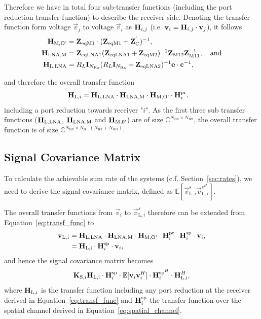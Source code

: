 Therefore we have in total four sub-transfer functions (including the port reduction transfer function) to describe the receiver side.
Denoting the transfer function form voltage $\vec{v}_j$ to voltage $\vec{v}_i$ as $\mathbf{H}_{i,j}$ (i.e. $\mathbf{v}_i = \mathbf{H}_{i,j} \cdot\mathbf{v}_j$), it follows
\begin{align}
\mathbf{H}_\text{M,O'} &= \mathbf{Z}_\text{eqM1}\cdot(\mathbf{Z}_\text{eqM1} + \mathbf{Z}_\text{C}^{'})^{-1}, \\
\mathbf{H}_\text{LNA,M} &= \mathbf{Z}_\text{eqLNA1}(\mathbf{Z}_\text{eqLNA1}+\mathbf{Z}_\text{eqM2})^{-1}\mathbf{Z}_\text{M12} \mathbf{Z}_\text{M11}^{-1},\quad\text{and}\\
\mathbf{H}_\text{L,LNA} &= R_L\mathbf{I}_{N_\text{Rx}}(R_L\mathbf{I}_{N_\text{Rx}}+\mathbf{Z}_\text{eqLNA2})^{-1}\mathbf{e}\cdot\mathbf{c}^{-1},
\end{align}

and therefore the overall transfer function
\begin{align}
\label{eq:transf_func}
\mathbf{H}_{\text{L},i} &= 
	\mathbf{H}_\text{L,LNA}\cdot\mathbf{H}_\text{LNA,M}\cdot\mathbf{H}_\text{M,O'}\cdot\mathbf{H}_i^\text{pr}.
\end{align}
including a port reduction towards receiver "$i$".
As the first three sub transfer functions ($\mathbf{H}_\text{L,LNA}$, $\mathbf{H}_\text{LNA,M}$ and $\mathbf{H}_\text{M,0'}$) are of size
$\mathbb{C}^{N_\text{Rx}\times N_\text{Rx}}$, the overall transfer function is of size
$\mathbb{C}^{N_\text{Rx}\times N_\text{R}\cdot\left(N_\text{Rx}+N_\text{Rel}\right)}$.
	


\subsection{Signal Covariance Matrix}
\label{sec:sig_cov}
To calculate the achievable sum rate of the systems (c.f. Section~\ref{sec:rates}), we need to derive the signal covariance matrix, defined as $\mathbb{E}[\vec{v}_{\text{L},i}^s\vec{v}_{\text{L},i}^{s^H}]$.

The overall transfer functions from $\vec{v}_i$ to $\vec{v}_{\text{L},i}^s$ therefore can be extended from Equation~\eqref{eq:transf_func} to
\begin{align}
\label{eq:transfer_function}
 \mathbf{v}_{\text{L},i}&= \mathbf{H}_\text{L,LNA}\cdot\mathbf{H}_\text{LNA,M}\cdot\mathbf{H}_\text{M,O'}
		\cdot \mathbf{H}_i^{\text{pr}}\cdot\mathbf{H}_{i}^{\text{sp}} \cdot\mathbf{v}_i,\\\nonumber
 &=\mathbf{H}_\text{L,i}\cdot \mathbf{H}_{i}^{\text{sp}}\cdot\mathbf{v}_i,
\end{align}
and hence the signal covariance matrix becomes
\begin{equation}
\label{eq:sig_cov}
\mat{K}_{\text{S},i}%
	\mat{H}_\text{L,i}\cdot \mat{H}_{i}^{\text{sp}}
	\cdot\mathbb{E}[\vec{v}_i\vec{v}_i^H]\cdot
	\mat{H}_{i}^{\text{sp}^H} \cdot \mat{H}_\text{L,i}^H,
\end{equation}
where $\mathbf{H}_\text{L,i}$ is the transfer function including any port reduction at the receiver derived in Equation~\eqref{eq:transf_func} and $\mathbf{H}_{i}^{\text{sp}}$ the transfer function over the spatial channel derived in Equation~\eqref{eq:spatial_channel}.

